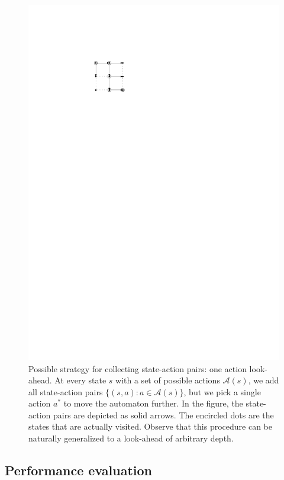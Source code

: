 \documentclass[a4paper]{article}
\theoremstyle{definition}
\theoremstyle{plain}
\begin{document}
\begin{figure}
  \centering
  \includegraphics[scale=1.5]{figures/network/state_action_collection}
  \caption{Possible strategy for collecting state-action pairs: one action
    look-ahead. At every state $s$ with a set of possible actions
    $\mathcal{A}(s)$, we add all state-action pairs
    $\{ (s, a) : a \in \mathcal{A}(s) \}$, but we pick a single action $a^{*}$
    to move the automaton further. In the figure, the state-action pairs are
    depicted as solid arrows. The encircled dots are the states that are
    actually visited. Observe that this procedure can be naturally generalized
    to a look-ahead of arbitrary depth.}
  \label{fig:state_action_collection}
\end{figure}

\subsection{Performance evaluation}
\end{document}
